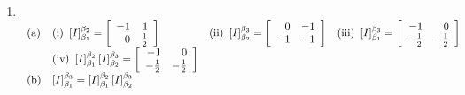 \documentclass{report}
\begin{document}
\begin{enumerate}
\item  \ $
\begin{array}[t]{llll}
\text{(a)} & \text{(i) }\left[ I\right] _{\beta _{1}}^{\beta _{2}}=\left[
\begin{array}{rr}
-1 & 1 \\
0 & \frac{1}{2}
\end{array}
\right]  & \text{(ii) }\left[ I\right] _{\beta _{2}}^{\beta _{3}}=\left[
\begin{array}{rr}
0 & -1 \\
-1 & -1
\end{array}
\right]  & \text{(iii) }\left[ I\right] _{\beta _{1}}^{\beta _{3}}=\left[
\begin{array}{rr}
-1 & 0 \\
-\frac{1}{2} & -\frac{1}{2}
\end{array}
\right]  \\
& \text{(iv) }\left[ I\right] _{\beta _{1}}^{\beta _{2}}\left[ I\right]
_{\beta _{2}}^{\beta _{3}}=\left[
\begin{array}{rr}
-1 & 0 \\
-\frac{1}{2} & -\frac{1}{2}
\end{array}
\right]  &  &  \\
\text{(b)} & \left[ I\right] _{\beta _{1}}^{\beta _{3}}=\left[ I\right]
_{\beta _{1}}^{\beta _{2}}\left[ I\right] _{\beta _{2}}^{\beta _{3}} &  &
\end{array}
$ $\;\;\;\;\;\;\;$\newline
\qquad \newline
\end{enumerate}
\end{document}
